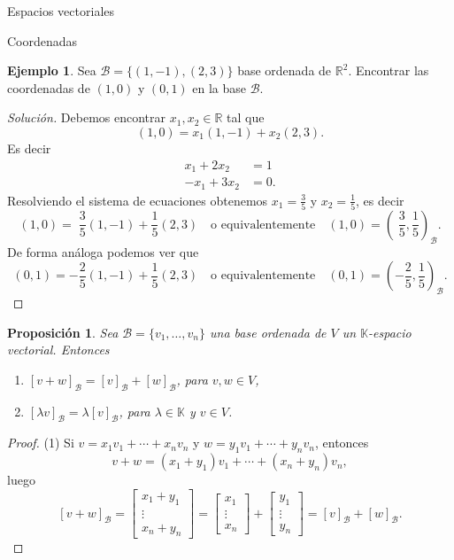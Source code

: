 \documentclass[a4paper,12pt,twoside,spanish,reqno]{amsbook}
\newtheorem{proposicion}[teorema]{Proposici\'on}
\theoremstyle{definition}
\newtheorem{ejemplo}{Ejemplo}[section]
\theoremstyle{remark}
\newcommand{\R}{\mathbb R}
\newcommand{\K}{\mathbb K}
\begin{document}
\begin{chapter}{Espacios vectoriales}
\begin{section}{Coordenadas}
	\begin{ejemplo}
		Sea $\mathcal B = \{(1,-1),(2,3)\}$ base ordenada de $\R^2$. Encontrar las coordenadas  de $(1,0)$ y $(0,1)$ en la base $\mathcal B$.
	\end{ejemplo}
	\begin{proof}[Solución] Debemos encontrar $x_1, x_2 \in \R$ tal que 
		$$
		(1,0) = x_1(1,-1)+ x_2(2,3).
		$$
		Es decir 
		\begin{align*}
			x_1+ 2x_2 &= 1\\
			-x_1 + 3x_2 &= 0.
		\end{align*}
		Resolviendo el sistema de ecuaciones obtenemos $x_1 = \frac35$ y $x_2 = \frac15$,  es decir
		$$
		(1,0) =\; \frac35(1,-1)+ \frac15(2,3)\quad \text{o equivalentemente} \quad (1,0) = (\;\frac35,\frac15)_{\mathcal B}.
		$$ 
		De forma análoga podemos ver que
		$$
		(0,1) = -\frac25(1,-1)+ \frac15(2,3)\quad \text{o equivalentemente} \quad (0,1) = (-\frac25,\frac15)_{\mathcal B}.
		$$
	\end{proof}
	
	\begin{proposicion}\label{vectorbase->lineal}
		Sea $\mathcal{B}=\{v_1,\ldots,v_n\}$ una base ordenada de $V$ un $\K$-espacio vectorial. Entonces
		\begin{enumerate}
			\item $[v + w]_\mathcal{B} = [v]_\mathcal{B} +[w]_\mathcal{B}$, para $v,w \in V$,
			\item $[\lambda v]_\mathcal{B} = \lambda[v]_\mathcal{B}$, para $\lambda \in \K$ y $v \in V$.
		\end{enumerate}
	\end{proposicion} 
	\begin{proof}
		(1) Si $v = x_1v_1 + \cdots +x_nv_n$ y $w = y_1v_1 + \cdots +y_nv_n$, entonces 
		$$
		v + w = (x_1+y_1)v_1 + \cdots +(x_n+y_n)v_n,
		$$
		luego
		$$
		[v + w]_\mathcal{B} = \begin{bmatrix}x_1+y_1 \\ \vdots \\ x_n+y_n\end{bmatrix}
		= \begin{bmatrix}x_1 \\ \vdots \\ x_n\end{bmatrix}+\begin{bmatrix}y_1 \\ \vdots \\ y_n\end{bmatrix} = [v]_\mathcal{B} +[w]_\mathcal{B}.
		$$
		

\end{proof}
\end{section}
\end{chapter}
\end{document}
